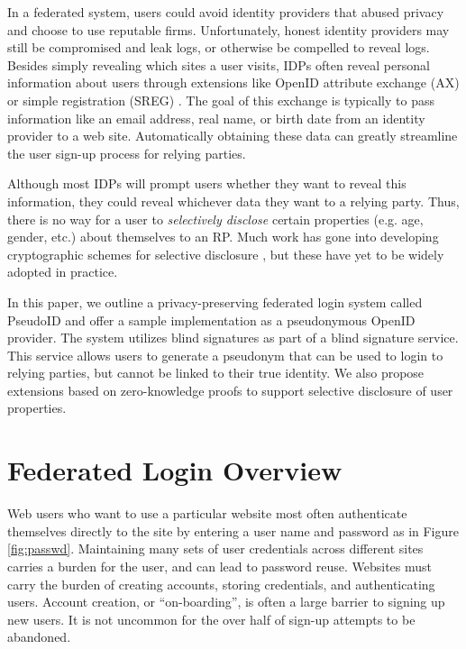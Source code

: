 \documentclass{llncs}
\begin{document}
In a federated system, users could avoid identity providers that
abused privacy and choose to use reputable firms. Unfortunately,
honest identity providers may still be compromised and leak logs, or
otherwise be compelled to reveal logs. Besides simply revealing which
sites a user visits, IDPs often reveal personal information about
users through extensions like OpenID attribute exchange (AX) \cite{AX}
or simple registration (SREG) \cite{Sreg}. The goal of this exchange
is typically to pass information like an email address, real name, or
birth date from an identity provider to a web site. Automatically
obtaining these data can greatly streamline the user sign-up process
for relying parties.

Although most IDPs will prompt users whether they want to reveal this
information, they could reveal whichever data they want to a relying
party. Thus, there is no way for a user to \emph{selectively disclose}
certain properties (e.g. age, gender, etc.) about themselves to an
RP. Much work has gone into developing cryptographic schemes for
selective disclosure \cite{CaLy01,CaLy04,CHL05,CaGr08}, but these have
yet to be widely adopted in practice.

In this paper, we outline a privacy-preserving federated login system
called PseudoID and offer a sample implementation as a pseudonymous
OpenID provider. The system utilizes blind signatures \cite{Cha82} as
part of a blind signature service. This service allows users to
generate a pseudonym that can be used to login to relying parties, but
cannot be linked to their true identity. We also propose 
extensions based on zero-knowledge proofs \cite{GMR89} to support
selective disclosure of user properties.

\section{Federated Login Overview}
\label{sec:fedlogin}

Web users who want to use a particular website most often authenticate
themselves directly to the site by entering a user name and password as
in Figure \ref{fig:passwd}. Maintaining many sets of user credentials
across different sites carries a burden for the user, and can lead to
password reuse. Websites must carry the burden of creating accounts,
storing credentials, and authenticating users. Account creation, or
``on-boarding'', is often a large barrier to signing up new users. It
is not uncommon for the over half of sign-up attempts to be abandoned.
\end{document}
